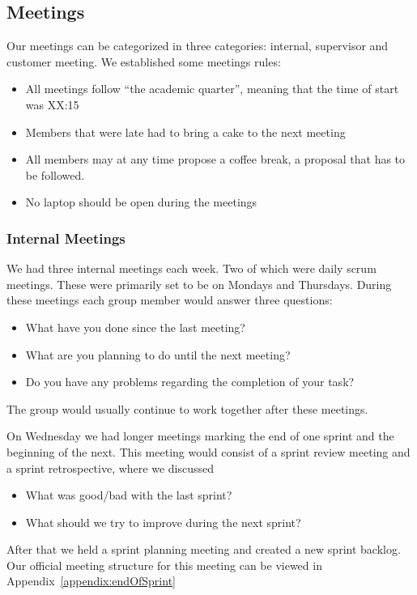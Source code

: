 \subsection{Meetings}
Our meetings can be categorized in three categories: internal, supervisor and
customer meeting. We established some meetings rules:
\begin{itemize}
    \item All meetings follow ``the academic quarter'', meaning that the time
        of start was XX:15
    \item Members that were late had to bring a cake to the next meeting
    \item All members may at any time propose a coffee break, a proposal that
        has to be followed. 
    \item No laptop should be open during the meetings
\end{itemize}

\subsubsection{Internal Meetings}
We had three internal meetings each week. Two of which were daily scrum
meetings. These were primarily set to be on Mondays and Thursdays.
During these meetings each group member would answer three questions: 
\begin{itemize}
    \item What have you done since the last meeting?
    \item What are you planning to do until the next meeting?
    \item Do you have any problems regarding the completion of your task? 
\end{itemize}
The group would usually continue to work together after these meetings. 

On Wednesday we had longer meetings marking the end of one sprint and
the beginning of the next. This meeting would consist of a sprint
review meeting and a sprint retrospective, where we discussed
\begin{itemize}
    \item What was good/bad with the last sprint?
    \item What should we try to improve during the next sprint?
\end{itemize}
After that we held a sprint planning meeting and created a new sprint
backlog. Our official meeting structure for this meeting can be viewed in
Appendix~\ref{appendix:endOfSprint}


